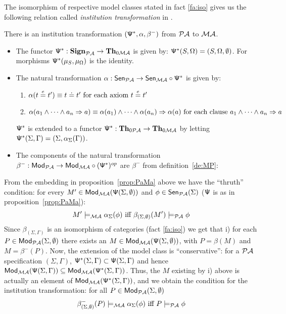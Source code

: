 \documentclass[10pt]{article}
\begin{document}
The isomorphism of respective model classes stated in fact \ref{fa:iso} gives
us the following relation 
called {\em institution transformation} in \cite{system}.
\begin{proposition}\label{prop:PaMaT}
There is an institution transformation $({\sf {\Psi}}^*,\alpha, \beta^{-})$ from
${\mathcal{PA}}$ to ${\mathcal{MA}}$.
\end{proposition}
%
\begin{PROOF}
\begin{itemize}
\item The functor ${\sf {\Psi}}^*: {\bf Sign}_{{\mathcal{PA}}} \to {\bf Th}_{0{\mathcal{MA}}}$ is given
by: ${\sf {\Psi}}^*(S,\Omega)= (S,\Omega,\emptyset)$. For  morphisms
${\sf {\Psi}}^*(\mu_S,\mu_{\Omega})$ is the identity.  
\item The natural transformation
$\alpha: {\sf {Sen}}_{{\mathcal{PA}}} \to {\sf {Sen}}_{{\mathcal{MA}}} \circ {\sf {\Psi}}^*$ is given by:
   \begin{enumerate} 
    \item $\alpha(t \stackrel{e}{=} t') \equiv t \mathrel{\dot{=} } t'\mbox{ for
each axiom }t \stackrel{e}{=} t'$ 
    \item $\alpha(a_1 \wedge \cdots \wedge a_n
\Rightarrow a) \equiv \alpha(a_1) \wedge \cdots \wedge \alpha(a_n)
\Rightarrow \alpha(a)\mbox{ for each clause }a_1 \wedge \cdots \wedge
a_n \Rightarrow a$ 
   \end{enumerate}
${\sf {\Psi}}^*$ is extended to a functor 
${\sf {\Psi}}^*: {\bf Th}_{0{\mathcal{PA}}} \to {\bf Th}_{0{\mathcal{MA}}}$ by letting
${\sf {\Psi}}^*(\Sigma,\Gamma) = (\Sigma,\alpha_\Sigma(\Gamma))$.
%
\item The components of the natural transformation $\beta^{-}: {\sf {Mod}}_{{\mathcal{PA}}} \to
{\sf {Mod}}_{{\mathcal{MA}}} \circ ({\sf {\Psi}}^*)^{op}$ are $\beta^-$ from
definition~\ref{de:MP}:
\end{itemize}
From the embedding in proposition~\ref{prop:PaMa} above we have the
``thruth'' condition: for every
$M'\in{\sf {Mod}}_{{\mathcal{MA}}}({\sf {\Psi}}(\Sigma,\emptyset))$ and $\phi \in
{\sf {Sen}}_{{\mathcal{PA}}}(\Sigma)$ (${\sf {\Psi}}$ is as in proposition~\ref{prop:PaMa}):
\begin{equation}
\label{eq:tcpZ} 
M' \models_{{\mathcal{MA}}} \alpha_{\Sigma}(\phi) \mbox{ iff } 
\beta_{(\Sigma,\emptyset)} (M') \models_{{\mathcal{PA}}} \phi  
\end{equation}
Since $\beta_{(\Sigma,\Gamma)}$ is an isomorphism of categories (fact
\ref{fa:iso}) we get that i) for each $P\in{\sf {Mod}}_{{\mathcal{PA}}}(\Sigma,\emptyset)$
there exists an $M \in{\sf {Mod}}_{{\mathcal{MA}}}({\sf {\Psi}}(\Sigma,\emptyset))$, with $P
= \beta(M)$ and $M = \beta^{-}(P)$. Now, the extension of the model class is
``conservative'': for a ${\mathcal{PA}}$ specification $(\Sigma,\Gamma)$,
${\sf {\Psi}}^*(\Sigma,\Gamma)\subset {\sf {\Psi}}(\Sigma,\Gamma)$  and hence
${\sf {Mod}}_{{\mathcal{MA}}}({\sf {\Psi}}(\Sigma,\Gamma)) \subseteq
{\sf {Mod}}_{{\mathcal{MA}}}({\sf {\Psi}}^*(\Sigma,\Gamma))$. Thus, the $M$ existing by i)
above is actually an element of
${\sf {Mod}}_{{\mathcal{MA}}}({\sf {\Psi}}^*(\Sigma,\Gamma))$, and we obtain the condition
for the institution transformation:
for all $P \in {\sf {Mod}}_{{\mathcal{PA}}}(\Sigma,\emptyset)$
\begin{equation}
\label{eq:tcp1} 
\beta^{-}_{(\Sigma,\emptyset)} (P) \models_{{\mathcal{MA}}} \alpha_{\Sigma}(\phi) \mbox{ iff } 
P \models_{{\mathcal{PA}}} \phi  
\end{equation}
\end{PROOF}
\end{document}
